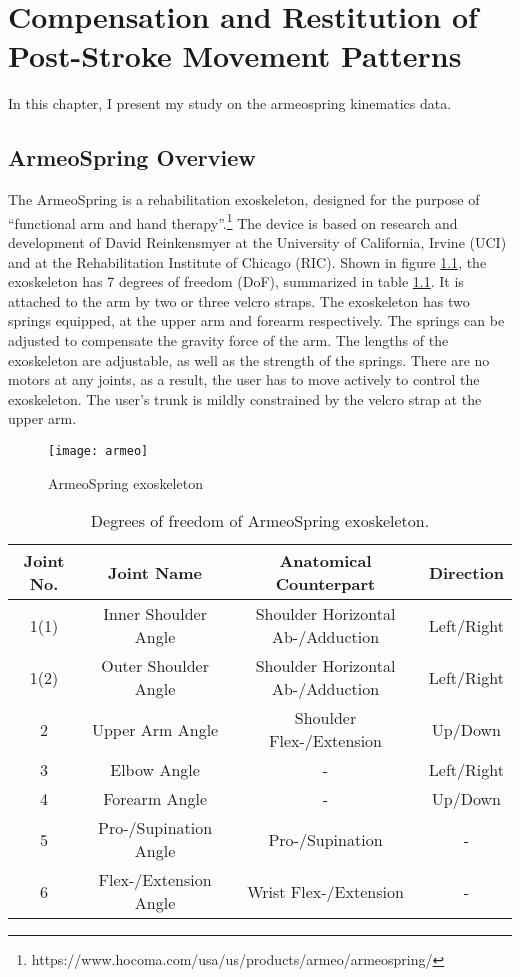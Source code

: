 \chapter{Compensation and Restitution of Post-Stroke Movement Patterns}
\label{cha:armeospring}

In this chapter, I present my study on the armeospring kinematics data.

\section{ArmeoSpring Overview}
\label{sec:overview}

The ArmeoSpring is a rehabilitation exoskeleton, designed for the purpose of ``functional arm and hand therapy''.\footnote{https://www.hocoma.com/usa/us/products/armeo/armeospring/} The device is based on research and development of David Reinkensmyer at the University of California, Irvine (UCI) and at the Rehabilitation Institute of Chicago (RIC). Shown in figure \ref{fig:armeo}, the exoskeleton has 7 degrees of freedom (DoF), summarized in table \ref{tab:devicedof}. It is attached to the arm by two or three velcro straps. The exoskeleton has two springs equipped, at the upper arm and forearm respectively. The springs can be adjusted to compensate the gravity force of the arm. The lengths of the exoskeleton are adjustable, as well as the strength of the springs. There are no motors at any joints, as a result, the user has to move actively to control the exoskeleton. The user's trunk is mildly constrained by the velcro strap at the upper arm. 

\begin{figure}
	\texttt{[image: armeo]}
	\centering
	\caption{ArmeoSpring exoskeleton}
	\label{fig:armeo}
\end{figure}

\begin{table}
	\begin{tabular}{c c c c}
	\hline
	Joint No. & Joint Name & Anatomical Counterpart & Direction \\
	\hline
	1(1) & Inner Shoulder Angle & Shoulder Horizontal Ab-/Adduction & Left/Right \\
	1(2) & Outer Shoulder Angle & Shoulder Horizontal Ab-/Adduction & Left/Right \\
	2 & Upper Arm Angle & Shoulder Flex-/Extension & Up/Down \\
	3 & Elbow Angle & - & Left/Right \\
	4 & Forearm Angle & - & Up/Down \\
	5 & Pro-/Supination Angle & Pro-/Supination & - \\ 
	6 & Flex-/Extension Angle & Wrist Flex-/Extension & - \\
	\hline
	\end{tabular}
	\caption{Degrees of freedom of ArmeoSpring exoskeleton.}
	\label{tab:devicedof}
\end{table}

